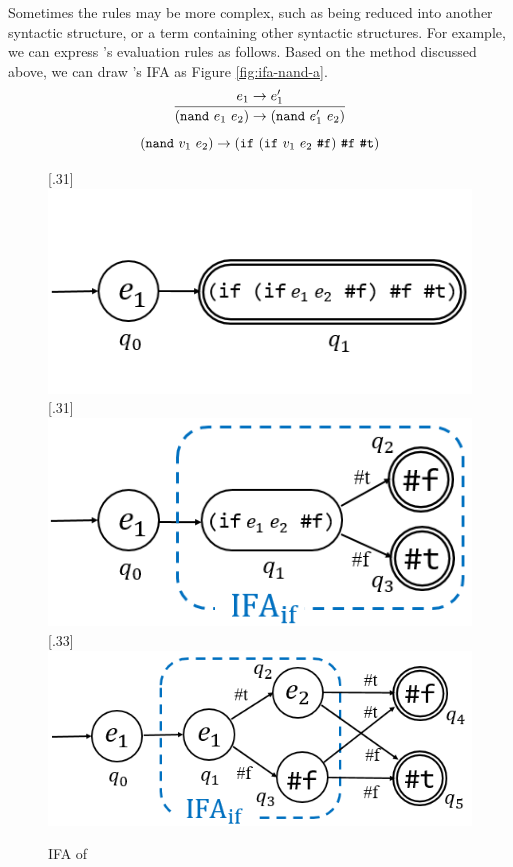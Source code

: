 \begin{example}

Sometimes the rules may be more complex, such as being reduced into another syntactic structure, or a term containing other syntactic structures. For example, we can express 's evaluation rules as follows. Based on the method discussed above, we can draw 's IFA as Figure \ref{fig:ifa-nand-a}.
\[
\infer{(\m{nand}~e_1~e_2) \to (\m{nand}~e_1'~e_2)}{e_1 \to e_1'}
\]\[
(\mbox{\tt nand}~v_1~e_2) \to (\mbox{\tt if}~(\mbox{\tt if}~v_1~e_2~\mbox{\tt \#f})~\mbox{\tt \#f}~\mbox{\tt \#t})
\]


\begin{figure}[t]
\centering
{}[.31\linewidth]{
    \includegraphics[scale=0.25]{images/ifa/ifa-nand-1-small.png}
}
[.31\linewidth]{
    \includegraphics[scale=0.25]{images/ifa/ifa-nand-2-small.png}
}
[.33\linewidth]{
    \includegraphics[scale=0.25]{images/ifa/ifa-nand-3-small.png}
}
\caption{IFA of }
\label{fig:ifa-nand}
\end{figure}


\end{example}
